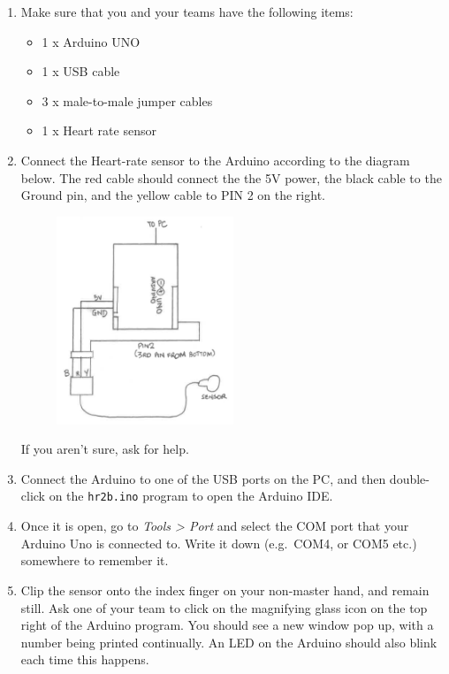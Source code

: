 \documentclass[11pt]{article}
\providecommand{\tightlist}{%
  \setlength{\itemsep}{0pt}\setlength{\parskip}{0pt}}
\begin{document}
\begin{enumerate}
\def\labelenumi{\arabic{enumi}.}
\tightlist
\item
  Make sure that you and your teams have the following items:
  \begin{itemize}
  \tightlist
  \item
    1 x Arduino UNO
  \item
    1 x USB cable
  \item
    3 x male-to-male jumper cables
  \item
    1 x Heart rate sensor
  \end{itemize}
\item
  Connect the Heart-rate sensor to the Arduino according to the diagram
  below. The red cable should connect the the 5V power, the black cable
  to the Ground pin, and the yellow cable to PIN 2 on the right.
  \begin{figure}[H]
  \begin{center}
  \includegraphics[width=0.5\textwidth]{../arduino_setup_yr19.png}
  \end{center}
  \end{figure}
  If you aren't sure, ask for help.
\item
  Connect the Arduino to one of the USB ports on the PC, and then
  double-click on the \texttt{hr2b.ino} program to open the Arduino IDE.
\item
  Once it is open, go to \emph{Tools \textgreater{} Port} and select the
  COM port that your Arduino Uno is connected to. Write it down
  (e.g.~COM4, or COM5 etc.) somewhere to remember it.
\item
  Clip the sensor onto the index finger on your non-master hand, and remain
  still. Ask one of your team to click on the magnifying glass icon on the top
  right of the Arduino program. You should see a new window pop up, with a number
  being printed continually. An LED on the Arduino should also blink each time
  this happens.
\end{enumerate}
\end{document}
